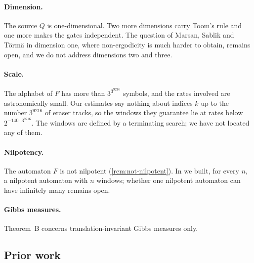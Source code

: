 \documentclass[11pt]{article}
\theoremstyle{plain}
\theoremstyle{definition}
\theoremstyle{remark}
\begin{document}
\paragraph{Dimension.} The source $Q$ is one-dimensional. Two more dimensions carry Toom's rule and one more makes the gates independent. The question of Marsan, Sablik and T\"orm\"a in dimension one, where non-ergodicity is much harder to obtain, remains open, and we do not address dimensions two and three.

\paragraph{Scale.} The alphabet of $F$ has more than $3^{3^{9216}}$ symbols, and the rates involved are astronomically small. Our estimates say nothing about indices $k$ up to the number $3^{9216}$ of eraser tracks, so the windows they guarantee lie at rates below $2^{-140\cdot3^{9216}}$. The windows are defined by a terminating search; we have not located any of them.

\paragraph{Nilpotency.} The automaton $F$ is not nilpotent (\cref{rem:not-nilpotent}). In \cite{DMnil} we built, for every $n$, a nilpotent automaton with $n$ windows; whether one nilpotent automaton can have infinitely many remains open.

\paragraph{Gibbs measures.} Theorem~B concerns translation-invariant Gibbs measures only.

\subsection{Prior work}
\end{document}
